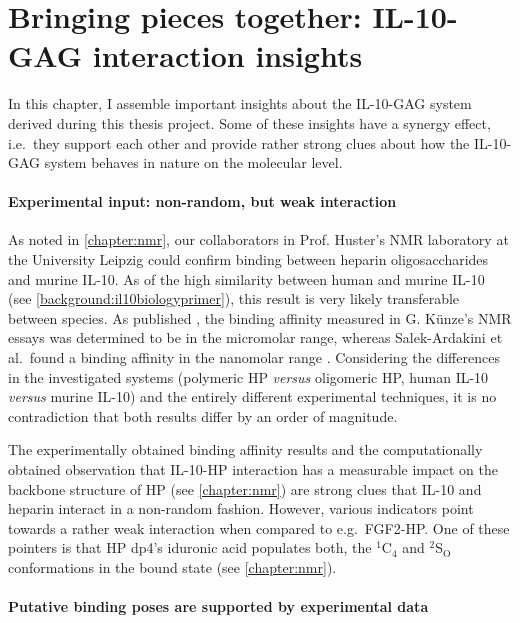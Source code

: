 \chapter{Bringing pieces together: IL-10-GAG interaction insights}

In this chapter, I assemble important insights about the IL-10-GAG system
derived during this thesis project. Some of these insights have a synergy
effect, i.e.\ they support each other and provide rather strong clues about how
the IL-10-GAG system behaves in nature on the molecular level.


\subsubsection{Experimental input: non-random, but weak interaction}

As noted in \cref{chapter:nmr}, our collaborators in Prof. Huster's NMR
laboratory at the University Leipzig could confirm binding between heparin
oligosaccharides and murine IL-10. As of the high similarity between human and
murine IL-10 (see \cref{background:il10biologyprimer}), this result is very
likely transferable between species. As published \cite{kuenze_gehrcke_2014},
the binding affinity measured in G. Künze's NMR essays was determined to be in
the micromolar range, whereas Salek-Ardakini et al.\ found a binding affinity in
the nanomolar range \cite{salek_ardakani_2000}. Considering the differences in
the investigated systems (polymeric HP \textit{versus} oligomeric HP, human
IL-10 \textit{versus} murine IL-10) and the entirely different experimental
techniques, it is no contradiction that both results differ by an order of
magnitude.

The experimentally obtained binding affinity results and the computationally
obtained observation that IL-10-HP interaction has a measurable impact on the
backbone structure of HP (see \cref{chapter:nmr}) are strong clues that IL-10
and heparin interact in a non-random fashion. However, various indicators point
towards a rather weak interaction when compared to e.g.\ FGF2-HP. One of these
pointers is that HP dp4's iduronic acid populates both, the ${}^1$C${}_4$ and
${}^2$S${}_\mathrm{O}$ conformations in the bound state (see
\cref{chapter:nmr}).


\subsubsection{Putative binding poses are supported by experimental data}

